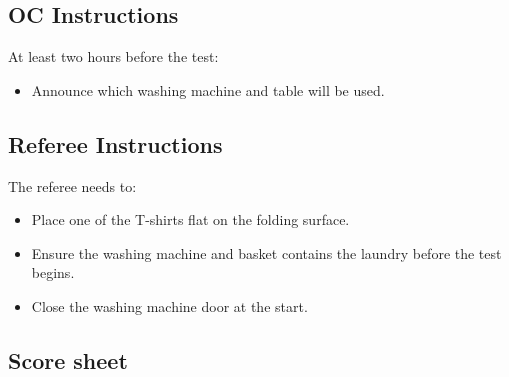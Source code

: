 \subsection*{OC Instructions}
At least two hours before the test:
\begin{itemize}
    \item Announce which washing machine and table will be used.
\end{itemize}

\subsection*{Referee Instructions}
The referee needs to:
\begin{itemize}
    \item Place one of the T-shirts flat on the folding surface.
    \item Ensure the washing machine and basket contains the laundry before the test begins.
    \item Close the washing machine door at the start.
\end{itemize}

\subsection*{Score sheet}

